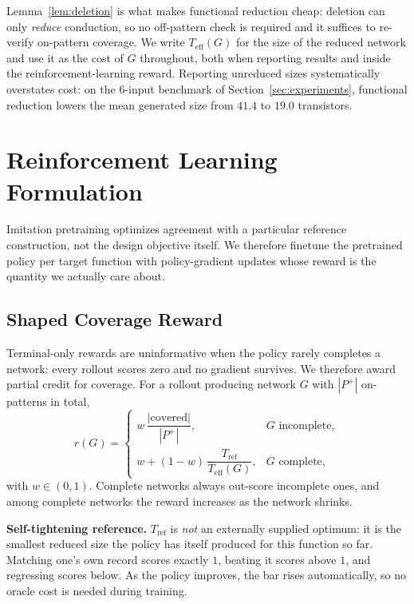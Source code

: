 \documentclass[11pt, a4paper]{article}
\theoremstyle{plain}
\theoremstyle{definition}
\theoremstyle{remark}
\newcommand{\Pplus}{P^{+}}
\begin{document}
Lemma~\ref{lem:deletion} is what makes functional reduction cheap:
deletion can only \emph{reduce} conduction, so no off-pattern check is
required and it suffices to re-verify on-pattern coverage.  We write
$T_{\mathrm{eff}}(G)$ for the size of the reduced network and use it as
the cost of $G$ throughout, both when reporting results and inside the
reinforcement-learning reward.  Reporting unreduced sizes systematically
overstates cost: on the $6$-input benchmark of
Section~\ref{sec:experiments}, functional reduction lowers the mean
generated size from $41.4$ to $19.0$ transistors.

\section{Reinforcement Learning Formulation}
\label{sec:rl}

Imitation pretraining optimizes agreement with a particular reference
construction, not the design objective itself.  We therefore finetune the
pretrained policy per target function with policy-gradient updates whose
reward is the quantity we actually care about.

\subsection{Shaped Coverage Reward}

Terminal-only rewards are uninformative when the policy rarely completes
a network: every rollout scores zero and no gradient survives.  We
therefore award partial credit for coverage.  For a rollout producing
network $G$ with $|\Pplus|$ on-patterns in total,
\[
  r(G) =
  \begin{cases}
    w\,\dfrac{|\text{covered}|}{|\Pplus|}, & G \text{ incomplete},\\[1.1em]
    w + (1-w)\,\dfrac{T_{\mathrm{ref}}}{T_{\mathrm{eff}}(G)},
      & G \text{ complete},
  \end{cases}
\]
with $w \in (0,1)$.  Complete networks always out-score incomplete ones,
and among complete networks the reward increases as the network shrinks.

\begin{notebox}
\textbf{Self-tightening reference.}
$T_{\mathrm{ref}}$ is \emph{not} an externally supplied optimum: it is the
smallest reduced size the policy has itself produced for this function so
far.  Matching one's own record scores exactly $1$, beating it scores
above $1$, and regressing scores below.  As the policy improves, the bar
rises automatically, so no oracle cost is needed during training.
\end{notebox}
\end{document}
